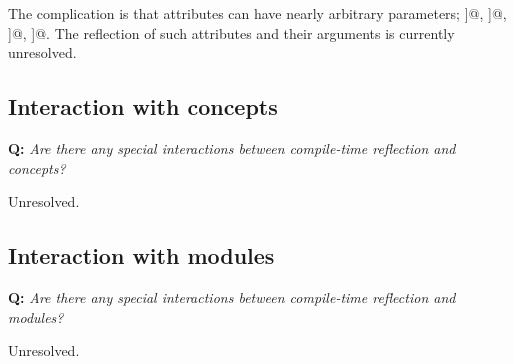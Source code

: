The complication is that attributes can have nearly arbitrary parameters;
\verb@[[probably(true)]]@, \verb@[[deprecated("reason")]]@,
\verb@[[visibility(hidden)]]@, \verb@[[gnu::aligned(64)]]@. The reflection of
such attributes and their arguments is currently unresolved.

\subsection{Interaction with concepts}

\textbf{Q:} {\em Are there any special interactions between compile-time
reflection and concepts?}

Unresolved.

\subsection{Interaction with modules}

\textbf{Q:} {\em Are there any special interactions between compile-time
reflection and modules?}

Unresolved.

